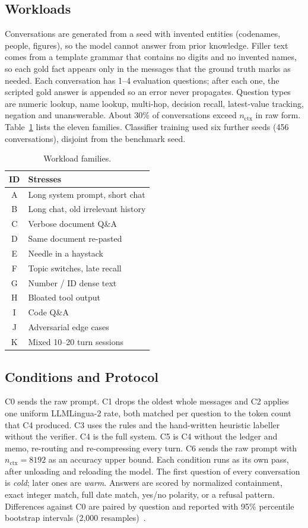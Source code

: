 \documentclass[journal]{IEEEtran}
\begin{document}
\subsection{Workloads}
Conversations are generated from a seed with invented entities (codenames, people, figures), so the model cannot answer from prior knowledge.
Filler text comes from a template grammar that contains no digits and no invented names, so each gold fact appears only in the messages that the
ground truth marks as needed. Each conversation has 1--4 evaluation questions; after each one, the scripted gold answer is appended so an error
never propagates. Question types are numeric lookup, name lookup, multi-hop, decision recall, latest-value tracking, negation and unanswerable.
About 30\% of conversations exceed $n_\text{ctx}$ in raw form. Table~\ref{tab:fam} lists the eleven families. Classifier training used six
further seeds (456 conversations), disjoint from the benchmark seed.
\begin{table}[t]\centering\caption{Workload families.}\label{tab:fam}\footnotesize
\begin{tabular}{cl}\toprule ID & Stresses\\\midrule
A & Long system prompt, short chat \\
B & Long chat, old irrelevant history \\
C & Verbose document Q\&A \\
D & Same document re-pasted \\
E & Needle in a haystack \\
F & Topic switches, late recall \\
G & Number / ID dense text \\
H & Bloated tool output \\
I & Code Q\&A \\
J & Adversarial edge cases \\
K & Mixed 10–20 turn sessions \\
\bottomrule\end{tabular}\end{table}

\subsection{Conditions and Protocol}
C0 sends the raw prompt. C1 drops the oldest whole messages and C2 applies one uniform LLMLingua-2 rate, both matched per question to the
token count that C4 produced. C3 uses the rules and the hand-written heuristic labeller without the verifier. C4 is the full system. C5 is C4
without the ledger and memo, re-routing and re-compressing every turn. C6 sends the raw prompt with $n_\text{ctx}=8192$ as an accuracy upper
bound. Each condition runs as its own pass, after unloading and reloading the model. The first question of every conversation is \emph{cold};
later ones are \emph{warm}. Answers are scored by normalized containment, exact integer match, full date match, yes/no polarity, or a refusal
pattern. Differences against C0 are paired by question and reported with 95\% percentile bootstrap intervals (2,000
resamples)~\cite{efron1993bootstrap}.
\end{document}
